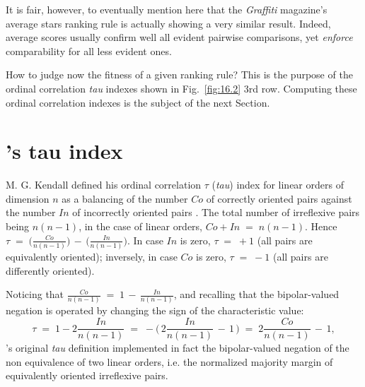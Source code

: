 It is fair, however, to eventually mention here that the \emph{Graffiti} magazine's average stars ranking rule is actually showing a very similar result. Indeed, average scores usually confirm well all evident pairwise comparisons, yet \emph{enforce} comparability for all less evident ones.

How to judge now the fitness of a given ranking rule? This is the purpose of the ordinal correlation \emph{tau} indexes shown in Fig.~\vref{fig:16.2} 3rd row. Computing these ordinal correlation indexes is the subject of the next Section.
 
\section{\Kendall 's tau index}
\label{sec:16:2}


M. G. Kendall defined his ordinal correlation $\tau$ (\emph{tau}) index for linear orders of dimension $n$ as a balancing of the number $Co$ of correctly oriented pairs against the number $In$ of incorrectly oriented pairs \citep{KEN-1938}. The total number of irreflexive pairs being $n(n-1)$, in the case of linear orders, $Co + In \;=\; n(n-1)$.  Hence $\tau \;=\; \big(\frac{Co}{n(n-1)}\big) \,-\, \big(\frac{In}{n(n-1)}\big)$. In case $In$ is zero, $\tau \;=\; +1$  (all pairs are equivalently oriented); inversely, in case $Co$ is zero, $\tau \;=\; -1$ (all pairs are differently oriented).

Noticing that $\frac{Co}{n(n-1)} \;=\; 1 \,-\, \frac{In}{n(n-1)}$, and recalling that the bipolar-valued negation is operated by changing the sign of the characteristic value:
\begin{equation}
      \tau \;=\; 1 -2\frac{In}{n(n-1)} \;=\; -\big(\,2\frac{In}{n(n-1)} \,-\, 1\,\big) \;=\; 2\frac{Co}{n(n-1)} \,-\, 1,
\end{equation} 
\Kendall 's original \emph{tau} definition implemented in fact the bipolar-valued negation of the non equivalence of two linear orders, i.e. the normalized majority margin of equivalently oriented irreflexive pairs.

